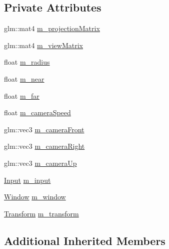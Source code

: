 \subsection*{Private Attributes}
\begin{DoxyCompactItemize}
\item 
glm\+::mat4 \mbox{\hyperlink{class_disc___engine_1_1_camera_abdfe1a9a61fdd2375b3d6fe66bf489e7}{m\+\_\+projection\+Matrix}}
\item 
glm\+::mat4 \mbox{\hyperlink{class_disc___engine_1_1_camera_af23cb5190c3e64c83c6db02f5ca079a8}{m\+\_\+view\+Matrix}}
\item 
float \mbox{\hyperlink{class_disc___engine_1_1_camera_a93d78c3c53584187c094f8a150e6cf21}{m\+\_\+radius}}
\item 
float \mbox{\hyperlink{class_disc___engine_1_1_camera_a87bce02c71ee29549f71aea5082e3f21}{m\+\_\+near}}
\item 
float \mbox{\hyperlink{class_disc___engine_1_1_camera_aa76779459c6c346087ae35568cb171c0}{m\+\_\+far}}
\item 
float \mbox{\hyperlink{class_disc___engine_1_1_camera_a663def657e7f01d15e89d3a857531bf3}{m\+\_\+camera\+Speed}}
\item 
glm\+::vec3 \mbox{\hyperlink{class_disc___engine_1_1_camera_ab9dd00bea9a0b70d32197448e729b187}{m\+\_\+camera\+Front}}
\item 
glm\+::vec3 \mbox{\hyperlink{class_disc___engine_1_1_camera_aff33d7da8adcabc058ff8c456bd16566}{m\+\_\+camera\+Right}}
\item 
glm\+::vec3 \mbox{\hyperlink{class_disc___engine_1_1_camera_a7d2e73b0bb4afd582172572ad333fbfa}{m\+\_\+camera\+Up}}
\item 
\mbox{\hyperlink{class_disc___engine_1_1_input}{Input}} \mbox{\hyperlink{class_disc___engine_1_1_camera_aa6101bf5a24ae258c25a443e0f4de6c6}{m\+\_\+input}}
\item 
\mbox{\hyperlink{class_disc___engine_1_1_window}{Window}} \mbox{\hyperlink{class_disc___engine_1_1_camera_a549f98bca9ff05e5c2b74f4ed366e0d8}{m\+\_\+window}}
\item 
\mbox{\hyperlink{class_disc___engine_1_1_transform}{Transform}} \mbox{\hyperlink{class_disc___engine_1_1_camera_a7e6aaf890356805e3a2a657211e74a46}{m\+\_\+transform}}
\end{DoxyCompactItemize}
\subsection*{Additional Inherited Members}


